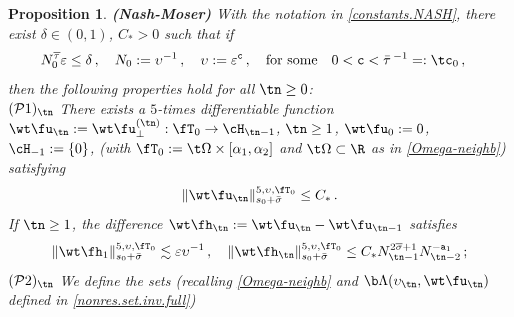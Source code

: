 \documentclass[a4paper,reqno,10pt]{article}
\newtheorem{pro}{Proposition}[section]
\begin{document}
\begin{pro}\label{NM.iteration} 
{\bf (Nash-Moser)} 
With the notation in \eqref{constants.NASH},
there exist $ \delta \in (0, 1)$, $C_* > 0$ such that if
\begin{equation}  \label{nash moser smallness condition} 
	\begin{aligned}
		& N_{0}^{\overline \tau} \varepsilon  \leq \delta \,, \quad N_{0} := \upsilon^{- 1}\,, \quad \upsilon := \varepsilon^{\mathtt c}\,,  \quad \text{for some} \ \ \  0 < \mathtt c < \bar\tau\,^{-1} =: \tc_{0}  \,,
	\end{aligned}
\end{equation}
then the following properties hold for all $\tn \geq 0$: 
\\[1mm]
\noindent $({\mathcal P}1)_{\tn}$
There exists a $5$-times differentiable function 
$\wt\fu_{\tn}:=\wt\fu_{\perp}^{(\tn)}: \fT_{0} \to \cH_{\tn - 1} $, $\tn \geq 1$, 
$\wt\fu_{0}:=0$, $\cH_{- 1} := \{ 0 \}$, (with $\fT_{0}:=\t\Omega \times [\alpha_{1},\alpha_{2}]$ and $\t\Omega\subset \R $ as in \eqref{Omega-neighb})
satisfying
\begin{equation} \label{stima.bassa.NM}
\| \wt\fu_{\tn} \|_{s_0 + \bar\sigma}^{5,\upsilon,\fT_{0}} \leq C_* \,.
\end{equation}
If $\tn \geq 1$, 
the difference $ \wt\fh_{\tn} := \wt\fu_{\tn} - \wt\fu_{\tn-1}$ satisfies  
\begin{equation} \label{hn}
\| \wt\fh_{1} \|_{s_0 + \bar\sigma}^{5,\upsilon,\fT_{0}} 
\lesssim \varepsilon \upsilon^{-1}\,, \quad
\| \wt\fh_{\tn} \|_{s_0 + \bar\sigma}^{5,\upsilon,\fT_{0}} 
\leq C_*  N_{\tn-1}^{2 \overline \sigma + 1} N_{\tn-2}^{-\mathtt a_1} \,;
\end{equation}
\noindent $({\mathcal P}2)_{\tn}$
We define the sets (recalling \eqref{Omega-neighb} and $\b\Lambda(\upsilon_{\tn},\wt\fu_{\tn})$ defined in \eqref{nonres.set.inv.full})

\end{pro}
\end{document}

